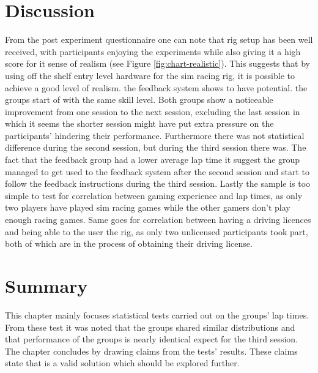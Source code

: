\section{Discussion}
\label{sec:eval-Discussion}
From the post experiment questionnaire one can note that rig setup has been well received, with participants enjoying the experiments while also giving it a high score for it sense of realism (see Figure \ref{fig:chart-realistic}). This suggests that by using off the shelf entry level hardware for the sim racing rig, it is possible to achieve a good level of realism. the feedback system shows to have potential. the groups start of with the same skill level. Both groups show a noticeable improvement from one session to the next session, excluding the last session in which it seems the shorter session might have put extra pressure on the participants' hindering their performance. Furthermore there was not statistical difference during the second session, but during the third session there was. The fact that the feedback group had a lower average lap time it suggest the group managed to get used to the feedback system after the second session and start to follow the feedback instructions during the third session. Lastly the sample is too simple to test for correlation between gaming experience and lap times, as only two players have played sim racing games while the other gamers don't play enough racing games. Same goes for correlation between having a driving licences and being able to the user the rig, as only two unlicensed participants took part, both of which are in the process of obtaining their driving license.

\section{Summary}
This chapter mainly focuses statistical tests carried out on the groups' lap times. From these test it was noted that the groups shared similar distributions and that performance of the groups is nearly identical expect for the third session. The chapter concludes by drawing claims from the tests' results. These claims state that \methodname is a valid solution which should be explored further.